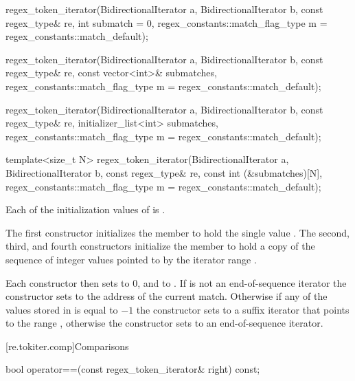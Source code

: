 %
\begin{itemdecl}
regex_token_iterator(BidirectionalIterator a, BidirectionalIterator b,
                     const regex_type& re,
                     int submatch = 0,
                     regex_constants::match_flag_type m = regex_constants::match_default);

regex_token_iterator(BidirectionalIterator a, BidirectionalIterator b,
                     const regex_type& re,
                     const vector<int>& submatches,
                     regex_constants::match_flag_type m = regex_constants::match_default);

regex_token_iterator(BidirectionalIterator a, BidirectionalIterator b,
                     const regex_type& re,
                     initializer_list<int> submatches,
                     regex_constants::match_flag_type m = regex_constants::match_default);

template<size_t N>
  regex_token_iterator(BidirectionalIterator a, BidirectionalIterator b,
                       const regex_type& re,
                       const int (&submatches)[N],
                       regex_constants::match_flag_type m = regex_constants::match_default);
\end{itemdecl}

\begin{itemdescr}
\pnum
\expects
Each of the initialization values of  is .

\pnum
\effects
The first constructor initializes the member  to hold the single
value .
The second, third, and fourth constructors
initialize the member  to hold a copy of the sequence of integer values
pointed to by the iterator range
.

\pnum
Each constructor then sets  to 0, and  to
. If  is not an
end-of-sequence iterator the constructor sets  to the
address of the current match. Otherwise if any of the values stored
in  is equal to $-1$ the constructor sets  to a suffix
iterator that points to the range , otherwise the constructor
sets  to an end-of-sequence iterator.
\end{itemdescr}

[re.tokiter.comp]{Comparisons}

%
\begin{itemdecl}
bool operator==(const regex_token_iterator& right) const;
\end{itemdecl}

